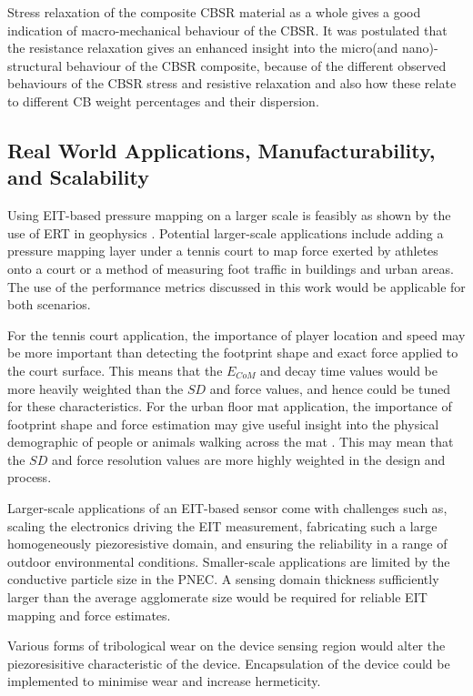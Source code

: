 Stress relaxation of the composite CBSR material as a whole gives a good indication of macro-mechanical behaviour of the CBSR. It was postulated that the resistance relaxation gives an enhanced insight into the micro(and nano)-structural behaviour of the CBSR composite, because of the different observed behaviours of the CBSR stress and resistive relaxation and also how these relate to different CB weight percentages and their dispersion.


\subsection{Real World Applications, Manufacturability, and Scalability}
Using EIT-based pressure mapping on a larger scale is feasibly as shown by the use of ERT in geophysics \citep{Griffiths1993}. Potential larger-scale applications include adding a pressure mapping layer under a tennis court to map force exerted by athletes onto a court or a method of measuring foot traffic in buildings and urban areas. The use of the performance metrics discussed in this work would be applicable for both scenarios. 

For the tennis court application, the importance of player location and speed may be more important than detecting the footprint shape and exact force applied to the court surface. This means that the $E_{CoM}$ and decay time values would be more heavily weighted than the $S\!D$ and force values, and hence could be tuned for these characteristics. For the urban floor mat application, the importance of footprint shape and force estimation may give useful insight into the physical demographic of people or animals walking across the mat \cite{Yuan2023}. This may mean that the $S\!D$ and force resolution values are more highly weighted in the design and process.

Larger-scale applications of an EIT-based sensor come with challenges such as, scaling the electronics driving the EIT measurement, fabricating such a large homogeneously piezoresistive domain, and ensuring the reliability in a range of outdoor environmental conditions. Smaller-scale applications are limited by the conductive particle size in the PNEC. A sensing domain thickness sufficiently larger than the average agglomerate size would be required for reliable EIT mapping and force estimates.

Various forms of tribological wear on the device sensing region would alter the piezoresisitive characteristic of the device. Encapsulation of the device could be implemented to minimise wear and increase hermeticity.

